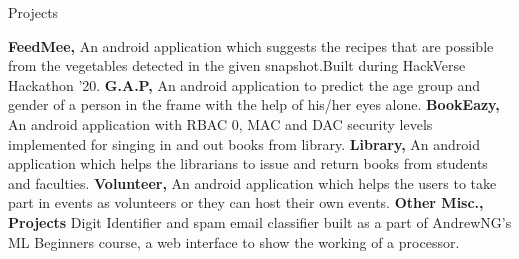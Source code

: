 \begin{rubric}{Projects}

\entry* \textbf{FeedMee,} An android application which suggests the recipes that are possible from the vegetables detected in the given snapshot.Built during HackVerse Hackathon '20.  
\entry* \textbf{G.A.P,} An android application to predict the age group and gender of a person in the frame with the help of his/her eyes alone.
\entry* \textbf{BookEazy,} An android application with RBAC 0, MAC and DAC security levels implemented for singing in and out books from library. 
\entry* \textbf{Library,} An android application which helps the librarians to issue and return books from students and faculties.
\entry* \textbf{Volunteer,} An android application which helps the users to take part in events as volunteers or they can host their own events.
\entry* \textbf{Other Misc., Projects} Digit Identifier and spam email classifier built as a part of AndrewNG's ML Beginners course, a web interface to show the working of a processor. 
\end{rubric}